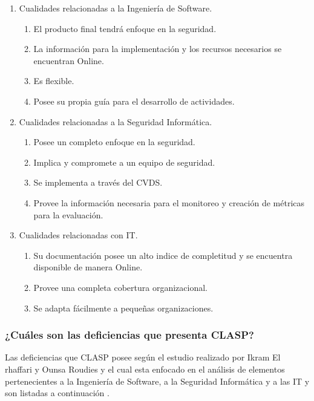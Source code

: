 \documentclass[runningheads,a4paper]{llncs}
\begin{document}
\begin{enumerate}
	\item Cualidades relacionadas a la Ingeniería de \gls{Software}.
		\begin{enumerate}
			\item El producto final tendrá enfoque en la seguridad.
			\item La información para la implementación y los recursos necesarios se encuentran \gls{Online}.
			\item Es flexible.
			\item Posee su propia guía para el desarrollo de actividades.\\
			
		\end{enumerate}
	\item Cualidades relacionadas a la Seguridad Informática.
		\begin{enumerate}
			\item Posee un completo enfoque en la seguridad.
			\item Implica y compromete a un equipo de seguridad.
			\item Se implementa a través del \gls{CVDS}.
			\item Provee la información necesaria para el monitoreo y creación de métricas para la evaluación.\\
		\end{enumerate}
	\item Cualidades relacionadas con \gls{IT}.
		\begin{enumerate}
			\item Su documentación posee un alto indice de completitud y se encuentra disponible de manera \gls{Online}.
			\item Provee una completa cobertura organizacional.
			\item Se adapta fácilmente a pequeñas organizaciones.
		\end{enumerate}
\end{enumerate}

\subsubsection{¿Cuáles son las deficiencias que presenta \gls{CLASP}?}
Las deficiencias que \gls{CLASP} posee según el estudio realizado por Ikram El rhaffari y Ounsa Roudies y el cual esta enfocado en el análisis de elementos pertenecientes a la Ingeniería de \gls{Software}, a la Seguridad Informática y a las \gls{IT} y son listadas a continuación \cite{BenchmarkingSDLCLAPS}. 
\end{document}
